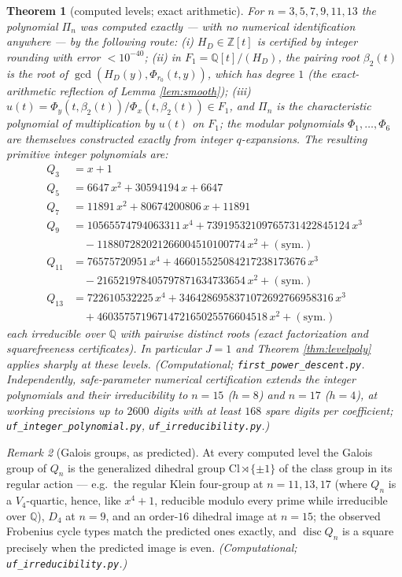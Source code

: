 \documentclass[11pt]{amsart}
\numberwithin{equation}{section}
\theoremstyle{plain}
\newtheorem{theorem}{Theorem}[section]
\theoremstyle{definition}
\theoremstyle{remark}
\newtheorem{remark}[theorem]{Remark}
\newcommand{\Q}{\mathbb{Q}}
\newcommand{\Z}{\mathbb{Z}}
\newcommand{\Cl}{\mathrm{Cl}}
\newcommand{\disc}{\operatorname{disc}}
\begin{document}
\begin{theorem}[computed levels; exact arithmetic]
\label{thm:pin-computed}\label{thm:pin-irred}
For $n = 3, 5, 7, 9, 11, 13$ the polynomial $\Pi_n$ was computed
\emph{exactly} --- with no numerical identification anywhere --- by the
following route: (i) $H_D \in \Z[t]$ is certified by integer rounding
with error $< 10^{-40}$; (ii) in $F_1 = \Q[t]/(H_D)$, the pairing root
$\beta_2(t)$ is the root of $\gcd(H_D(y), \Phi_{r_0}(t, y))$, which
has degree $1$ (the exact-arithmetic reflection of Lemma
\ref{lem:smooth}); (iii) $u(t) = \Phi_y(t, \beta_2(t))/\Phi_x(t,
\beta_2(t)) \in F_1$, and $\Pi_n$ is the characteristic polynomial of
multiplication by $u(t)$ on $F_1$; the modular polynomials
$\Phi_1, \dots, \Phi_6$ are themselves constructed exactly from
integer $q$-expansions.  The resulting primitive integer polynomials
are:
{\small
\begin{align*}
Q_3 &= x + 1\\
Q_5 &= 6647\,x^2 + 30594194\,x + 6647\\
Q_7 &= 11891\,x^2 + 80674200806\,x + 11891\\
Q_9 &= 10565574794063311\,x^4 + 73919532109765731422845124\,x^3\\
&\quad - 118807282021266004510100774\,x^2 + (\mathrm{sym.})\\
Q_{11} &= 76575720951\,x^4 + 466015525084217238173676\,x^3\\
&\quad - 216521978405797871634733654\,x^2 + (\mathrm{sym.})\\
Q_{13} &= 722610532225\,x^4 + 3464286958371072692766958316\,x^3\\
&\quad + 4603575719671472165025576604518\,x^2 + (\mathrm{sym.})
\end{align*}}
each irreducible over $\Q$ with pairwise distinct roots (exact
factorization and squarefreeness certificates).  In particular
$J = 1$ and Theorem \ref{thm:levelpoly} applies sharply at these
levels.  \emph{(Computational; \texttt{first\_power\_descent.py}.
Independently, safe-parameter numerical certification extends the
integer polynomials and their irreducibility to $n = 15$ ($h = 8$) and
$n = 17$ ($h = 4$), at working precisions up to $2600$ digits with at
least $168$ spare digits per coefficient;
\texttt{uf\_integer\_polynomial.py}, \texttt{uf\_irreducibility.py}.)}
\end{theorem}

\begin{remark}[Galois groups, as predicted]
At every computed level the Galois group of $Q_n$ is the generalized
dihedral group $\Cl \rtimes \{\pm 1\}$ of the class group in its
regular action --- e.g.\ the regular Klein four-group at
$n = 11, 13, 17$ (where $Q_n$ is a $V_4$-quartic, hence, like
$x^4 + 1$, reducible modulo every prime while irreducible over $\Q$),
$D_4$ at $n = 9$, and an order-$16$ dihedral image at $n = 15$; the
observed Frobenius cycle types match the predicted ones exactly, and
$\disc Q_n$ is a square precisely when the predicted image is even.
\emph{(Computational; \texttt{uf\_irreducibility.py}.)}
\end{remark}
\end{document}
